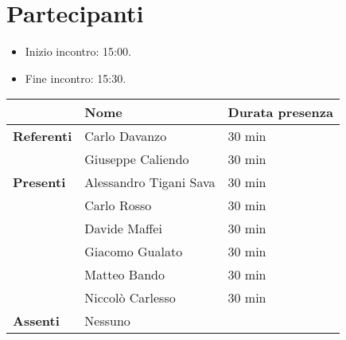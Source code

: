 \section{Partecipanti}

\begin{itemize}
    \item Inizio incontro: 15:00.
	\item Fine incontro: 15:30.
\end{itemize}


\begin{center}
{\renewcommand{\arraystretch}{1.5}
\begin{tabular}{l|ll}
	                    & \textbf{Nome}  			& \textbf{Durata presenza} 	\\
	\hline 
	\textbf{Referenti} 	& Carlo Davanzo 			& 30 min	\\
						& Giuseppe Caliendo 		& 30 min 	\\
	\hline
	\textbf{Presenti}   & Alessandro Tigani Sava    & 30 min 	\\   
		  				& Carlo Rosso           	& 30 min 	\\   
						& Davide Maffei          	& 30 min 	\\   
						& Giacomo Gualato           & 30 min 	\\        
						& Matteo Bando        		& 30 min 	\\       
						& Niccolò Carlesso       	& 30 min 	\\   
	\hline
	\textbf{Assenti}	& Nessuno    				&	        \\
\end{tabular}	
}
\end{center}
